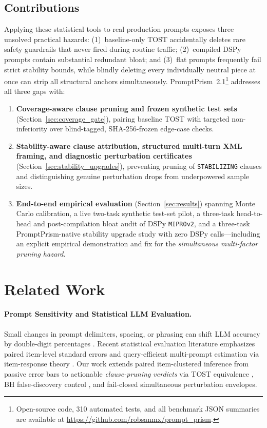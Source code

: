 \documentclass[11pt,a4paper]{article}
\newcommand{\method}{PromptPrism}
\begin{document}
\subsection{Contributions}
Applying these statistical tools to real production prompts exposes three unsolved practical hazards: (1)~baseline-only TOST accidentally deletes rare safety guardrails that never fired during routine traffic; (2)~compiled DSPy prompts contain substantial redundant bloat; and (3)~flat prompts frequently fail strict stability bounds, while blindly deleting every individually neutral piece at once can strip all structural anchors simultaneously. \method{}~2.1\footnote{Open-source code, 310 automated tests, and all benchmark JSON summaries are available at \url{https://github.com/robsanmx/prompt_prism}.} addresses all three gaps with:
\begin{enumerate}[leftmargin=*,nosep]
    \item \textbf{Coverage-aware clause pruning and frozen synthetic test sets} (Section~\ref{sec:coverage_gate}), pairing baseline TOST with targeted non-inferiority over blind-tagged, SHA-256-frozen edge-case checks.
    \item \textbf{Stability-aware clause attribution, structured multi-turn XML framing, and diagnostic perturbation certificates} (Section~\ref{sec:stability_upgrades}), preventing pruning of \texttt{STABILIZING} clauses and distinguishing genuine perturbation drops from underpowered sample sizes.
    \item \textbf{End-to-end empirical evaluation} (Section~\ref{sec:results}) spanning Monte Carlo calibration, a live two-task synthetic test-set pilot, a three-task head-to-head and post-compilation bloat audit of DSPy \texttt{MIPROv2}, and a three-task \method{}-native stability upgrade study with zero DSPy calls---including an explicit empirical demonstration and fix for the \emph{simultaneous multi-factor pruning hazard}.
\end{enumerate}

\section{Related Work}
\paragraph{Prompt Sensitivity and Statistical LLM Evaluation.}
Small changes in prompt delimiters, spacing, or phrasing can shift LLM accuracy by double-digit percentages \citep{sclar2024quantifying,mizrahi2024state,habba2025dove,habba2025promptsuite}. Recent statistical evaluation literature emphasizes paired item-level standard errors \citep{miller2024adding} and query-efficient multi-prompt estimation via item-response theory \citep{polo2024efficient,polo2024tinybenchmarks}. Our work extends paired item-clustered inference from passive error bars to actionable \emph{clause-pruning verdicts} via TOST equivalence \citep{schuirmann1987comparison}, BH false-discovery control \citep{benjamini1995controlling}, and fail-closed simultaneous perturbation envelopes.
\end{document}
